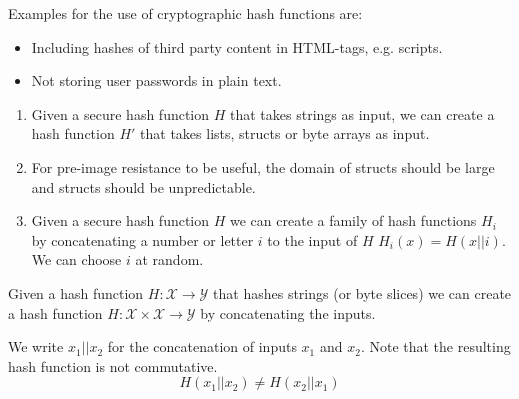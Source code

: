 
\begin{example}
Examples for the use of cryptographic hash functions are:
\begin{itemize}
	\item Including hashes of third party content in HTML-tags, e.g. scripts.
	\item Not storing user passwords in plain text.
\end{itemize}
\end{example}


\begin{note}
	\begin{enumerate}[label=\alph*)]
		\item Given a secure hash function $H$ that takes strings as input, we can create a hash function $H'$ that takes lists, structs or byte arrays as input.
		\item For pre-image resistance to be useful, the domain of structs should be large and structs should be unpredictable.
		\item Given a secure hash function $H$ we can create a family of hash functions $H_i$ by concatenating a number or letter $i$ to the input of $H$ $H_i(x)=H(x||i)$. We can choose $i$ at random.
	\end{enumerate}

\end{note}



\begin{note}
Given a hash function $H: \mathcal{X} \rightarrow \mathcal{Y}$ that hashes strings (or byte slices) we can create a hash function $H: \mathcal{X} \times \mathcal{X} \rightarrow \mathcal{Y}$ by concatenating the inputs.

We write $x_1|| x_2$ for the concatenation of inputs $x_1$ and $x_2$.
Note that the resulting hash function is not commutative.
\[
H(x_1||x_2) \neq H(x_2|| x_1)
\]
\end{note}

